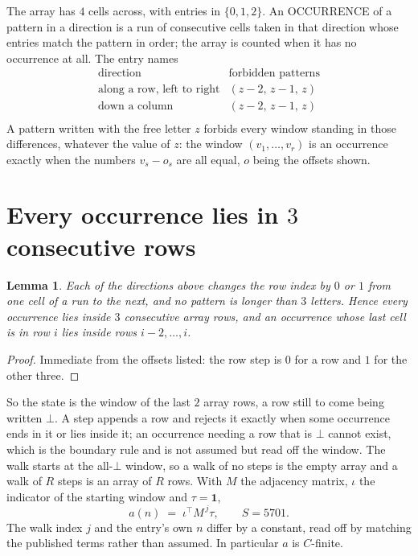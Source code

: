 \documentclass[11pt,a4paper]{article}
\theoremstyle{plain}
\newtheorem{lemma}[theorem]{Lemma}
\theoremstyle{definition}
\begin{document}
The array has $4$ cells across, with entries in $\{0,1,2\}$. An OCCURRENCE of a pattern in a
direction is a run of consecutive cells taken in that direction whose entries match the pattern
in order; the array is counted when it has no occurrence at all. The entry names
\[
\begin{array}{ll}
\text{direction} & \text{forbidden patterns} \\[2pt]
\text{along a row, left to right} & (z-2,\,z-1,\,z) \\
\text{down a column} & (z-2,\,z-1,\,z) \\
\end{array}
\]
 A pattern written with the free letter $z$ forbids every window standing in those differences, whatever the value of $z$: the window $(v_1,\dots,v_r)$ is an occurrence exactly when the numbers $v_s-o_s$ are all equal, $o$ being the offsets shown.

\section{Every occurrence lies in $3$ consecutive rows}

\begin{lemma}\label{lem:win}
Each of the directions above changes the row index by $0$ or $1$ from one cell of a run to the
next, and no pattern is longer than $3$ letters. Hence every occurrence lies inside $3$
consecutive array rows, and an occurrence whose last cell is in row $i$ lies inside rows
$i-2,\dots,i$.
\end{lemma}

\begin{proof}
Immediate from the offsets listed: the row step is $0$ for a row and $1$ for the other three.
\end{proof}

So the state is the window of the last $2$ array rows, a row still to come being written
$\bot$. A step appends a row and rejects it exactly when some occurrence ends in it or lies
inside it; an occurrence needing a row that is $\bot$ cannot exist, which is the boundary rule
and is not assumed but read off the window. The walk starts at the all-$\bot$ window, so a walk
of no steps is the empty array and a walk of $R$ steps is an array of $R$ rows. With $M$ the
adjacency matrix, $\iota$ the indicator of the starting window and $\tau=\mathbf{1}$,
\[
a(n)\;=\;\iota^{\!\top}M^{\,j}\tau ,\qquad S=5701.
\]
The walk index $j$ and the entry's own $n$ differ by a constant, read off by matching the
published terms rather than assumed. In particular $a$ is $C$-finite.
\end{document}
